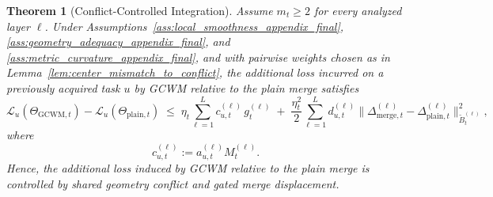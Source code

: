 \documentclass{article}
\newtheorem*{theoreml}{Theorem}
\begin{document}
\begin{theoreml}[Conflict-Controlled Integration]
\label{thm:conflict_controlled_integration_appendix_final}
Assume \(m_t \ge 2\) for every analyzed layer \(\ell\). Under Assumptions~\ref{ass:local_smoothness_appendix_final}, \ref{ass:geometry_adequacy_appendix_final}, and \ref{ass:metric_curvature_appendix_final}, and with pairwise weights chosen as in Lemma~\ref{lem:center_mismatch_to_conflict}, the additional loss incurred on a previously acquired task \(u\) by GCWM relative to the plain merge satisfies
\begin{equation}
\mathcal L_u(\Theta_{\mathrm{GCWM},t})
-
\mathcal L_u(\Theta_{\mathrm{plain},t})
\;\le\;
\eta_t \sum_{\ell=1}^L c_{u,t}^{(\ell)}\, g_t^{(\ell)}
\;+\;
\frac{\eta_t^2}{2}
\sum_{\ell=1}^L
d_{u,t}^{(\ell)}
\bigl\|
\Delta_{\mathrm{merge},t}^{(\ell)}-\Delta_{\mathrm{plain},t}^{(\ell)}
\bigr\|_{\widetilde B_t^{(\ell)}}^2,
\label{eq:theorem1_final_appendix_revised}
\end{equation}
where
\[
c_{u,t}^{(\ell)} := a_{u,t}^{(\ell)} M_t^{(\ell)}.
\]
Hence, the additional loss induced by GCWM relative to the plain merge is controlled by shared geometry conflict and gated merge displacement.
\end{theoreml}
\end{document}
